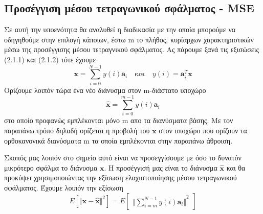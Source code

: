 \subsection{Προσέγγιση μέσου τετραγωνικού σφάλματος - \textlatin{MSE}}
\par
Σε αυτή την υποενότητα θα αναλυθεί η διαδικασία με την οποία μπορούμε να οδηγηθούμε στην επιλογή κάποιων, έστω \textlatin{m} το πλήθος, κυρίαρχων χαρακτηριστικών μέσω της προσέγγισης μέσου τετραγνικού σφάλματος. Ας πάρουμε ξανά τις εξισώσεις  (2.1.1) και (2.1.2) τότε έχουμε
\newline\hspace*{\fill}
\begin{equation}
        \mathbf{x} = \sum_{i=0}^{N-1} y(i)\mathbf{a}_{i} \quad \text{και} \quad y(i)=\mathbf{a}_{i}^{T}\mathbf{x}
\end{equation}
\hspace*{\fill}\newline
Ορίζουμε λοιπόν τώρα ένα νέο διάνυσμα στον \textlatin{m}-διάστατο υποχώρο
\newline\hspace*{\fill}
\begin{equation}
        \mathbf{\widehat{x}} = \sum_{i=0}^{m-1} y(i)\mathbf{a}_{i}
\end{equation}
\hspace*{\fill}\newline
στο οποίο προφανώς εμπλέκονται μόνο \textlatin{m} απο τα διανύσματα βάσης. Με τον παραπάνω τρόπο δηλαδή ορίζεται η προβολή του $\mathbf{x}$ στον υποχώρο που ορίζουν τα ορθοκανονικά διανύσματα \textlatin{m} τα οποία εμπλέκονται στην παραπάνω άθροιση. 
\par
Σκοπός μας λοιπόν στο σημείο αυτό είναι να προσεγγίσουμε με όσο το δυνατόν μικρότερο σφάλμα το διάνυσμα $\mathbf{x}$. Η προσέγγισή μας είναι το διάνυσμα $\mathbf{\widehat{x}}$ και θα προκύψει χρησιμοποιώντας την εξίσωση ελαχιστοποίησης μέσου τετραγωνικού σφάλματος. Έχουμε λοιπόν την εξίσωση 
\newline\hspace*{\fill}
\begin{equation}
        Ε[{\Vert \mathbf{x}-\mathbf{\widehat{x}} \Vert}^{2}] = E 			\begin{bmatrix}
	{\Vert \sum_{i=m}^{N-1} y(i)\mathbf{a}_{i} \Vert}^{2}        
        \end{bmatrix}
\end{equation}
\hspace*{\fill}\newline
